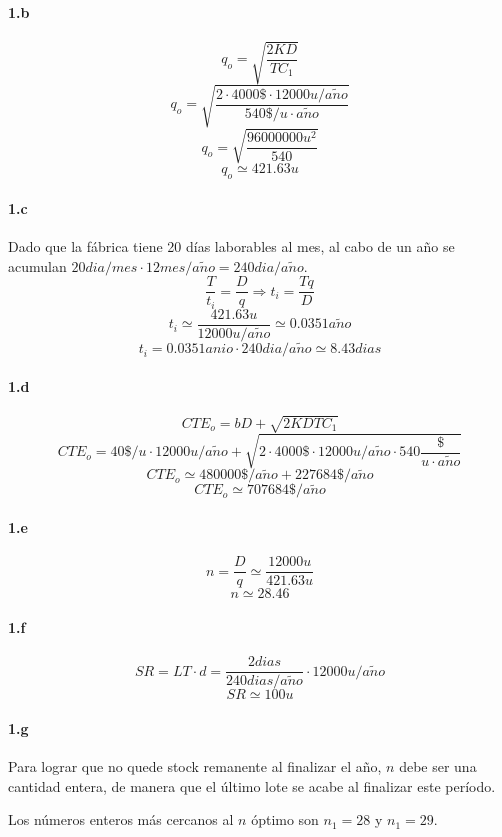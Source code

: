 \documentclass{article}
\def \anio {a\tilde{n}o}
\begin{document}
  \paragraph{1.b}
        $$ q_o = \sqrt{ \frac{2KD}{TC_1}} $$
        $$ q_o = \sqrt{ \frac{2 \cdot 4000\$ \cdot 12000u/\anio}{540\$/u\cdot\anio}} $$
        $$ q_o = \sqrt{ \frac{96000000u^2}{540}} $$
        $$ \boxed{ q_o \simeq 421.63u} $$

  \paragraph{1.c}
	Dado que la fábrica tiene 20 días laborables al mes, al cabo de un año se acumulan $20 dia/mes \cdot 12 mes/\anio = 240 dia/\anio$.
        $$ \frac{T}{t_i} = \frac{D}{q} \Rightarrow t_i = \frac{Tq}{D} $$
        $$ t_i \simeq \frac{421.63u}{12000u/\anio} \simeq 0.0351\anio $$
        $$ \boxed{ t_i = 0.0351anio \cdot 240dia/\anio \simeq 8.43dias } $$

  \paragraph{1.d}
        $$ CTE_o = bD + \sqrt{ 2KDTC_1 } $$
        $$ CTE_o = 40\$/u \cdot 12000u/\anio + \sqrt{ 2 \cdot 4000\$ \cdot 12000u/\anio \cdot 540\frac{\$}{u\cdot\anio} } $$
        $$ CTE_o \simeq 480000\$/\anio + 227684\$/\anio $$
        $$ \boxed{ CTE_o \simeq 707684\$/\anio } $$

  \paragraph{1.e}
        $$ n = \frac{D}{q} \simeq \frac{12000u}{421.63u} $$
        $$ \boxed{ n \simeq 28.46 } $$

  \paragraph{1.f}
        $$ SR = LT \cdot d = \frac{2 dias}{240dias/\anio} \cdot  12000u/\anio $$
        $$ \boxed{ SR \simeq 100u } $$

  \paragraph{1.g}
	Para lograr que no quede stock remanente al finalizar el año, $n$ debe ser una cantidad entera, de manera que el último lote se acabe al finalizar este período.

	Los números enteros más cercanos al $n$ óptimo son $n_1 = 28$ y $n_1 = 29$.
\end{document}
